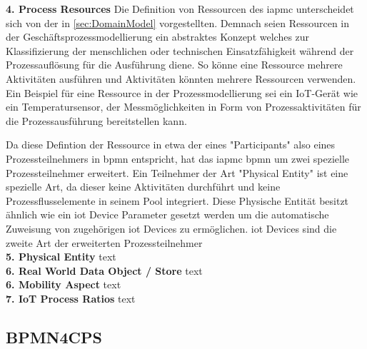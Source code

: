 \documentclass[a4paper, 12pt, twoside, headsepline=true]{scrartcl} %
\begin{document}
\textbf{4. Process Resources}
\newline
Die Definition von Ressourcen des \ac{iapmc} unterscheidet sich von der in \ref{sec:DomainModel} vorgestellten. Demnach seien Ressourcen in der Geschäftsprozessmodellierung ein abstraktes Konzept welches zur Klassifizierung der menschlichen oder technischen Einsatzfähigkeit während der Prozessauflösung für die Ausführung diene. So könne eine Ressource mehrere Aktivitäten ausführen und Aktivitäten könnten mehrere Ressourcen verwenden. Ein Beispiel für eine Ressource in der Prozessmodellierung sei ein IoT-Gerät wie ein Temperatursensor, der Messmöglichkeiten in Form von Prozessaktivitäten für die Prozessausführung bereitstellen kann\cite[S.54]{conceptsiotawarepm}. %

Da diese Defintion der Ressource in etwa der eines "Participants" also eines Prozessteilnehmers in \ac{bpmn} entspricht, hat das \ac{iapmc} \ac{bpmn} um zwei spezielle Prozessteilnehmer erweitert. Ein Teilnehmer der Art "Physical Entity" ist eine spezielle Art, da dieser keine Aktivitäten durchführt und keine Prozessflusselemente in seinem Pool integriert. Diese Physische Entität besitzt ähnlich wie ein \ac{iot} Device Parameter gesetzt werden um die automatische Zuweisung von zugehörigen \ac{iot} Devices zu ermöglichen. \ac{iot} Devices sind die zweite Art der erweiterten Prozessteilnehmer
\\

\textbf{5. Physical Entity}
\newline
text
\\

\textbf{6. Real World Data Object / Store}
\newline
text
\\

\textbf{6. Mobility Aspect}
\newline
text
\\

\textbf{7. IoT Process Ratios}
\newline
text
\\

\subsection{BPMN4CPS}

\newpage
\end{document}
